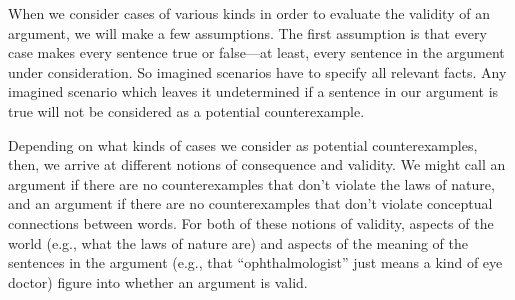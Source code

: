 When we consider cases of various kinds in order to evaluate the validity of an argument, we will make a few assumptions. The first assumption is that every case makes every sentence true or false---at least, every sentence in the argument under consideration. 
So imagined scenarios have to specify all relevant facts. 
Any imagined scenario which leaves it undetermined if a sentence in our argument is true will not be considered as a potential counterexample. 

Depending on what kinds of cases we consider as potential counterexamples, then, we arrive at different notions of consequence and validity. We might call an argument  if there are no counterexamples that don't violate the laws of nature, and an argument  if there are no counterexamples that don't violate conceptual connections between words.
For both of these notions of validity, aspects of the world (e.g., what the laws of nature are) and aspects of the meaning of the sentences in the argument (e.g., that ``ophthalmologist'' just means a kind of eye doctor) figure into whether an argument is valid.


